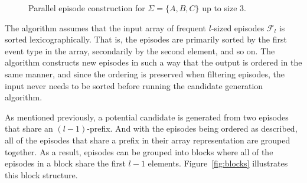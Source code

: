 \begin{figure}
\centering


\caption{Parallel episode construction for $ \Sigma = \{ A, B, C \} $ up to size 3.}

\label{fig:parallel-episode-lattice}
\end{figure}

The algorithm assumes that the input array of frequent $ l $-sized episodes $ \mathcal{F}_l $ is sorted lexicographically. That is, the episodes are primarily sorted by the first event type in the array, secondarily by the second element, and so on. The algorithm constructs new episodes in such a way that the output is ordered in the same manner, and since the ordering is preserved when filtering episodes, the input never needs to be sorted before running the candidate generation algorithm.

As mentioned previously, a potential candidate is generated from two episodes that share an $ (l - 1) $-prefix. And with the episodes being ordered as described, all of the episodes that share a prefix in their array representation are grouped together. As a result, episodes can be grouped into blocks where all of the episodes in a block share the first $ l - 1 $ elements. Figure~\ref{fig:blocks} illustrates this block structure.

